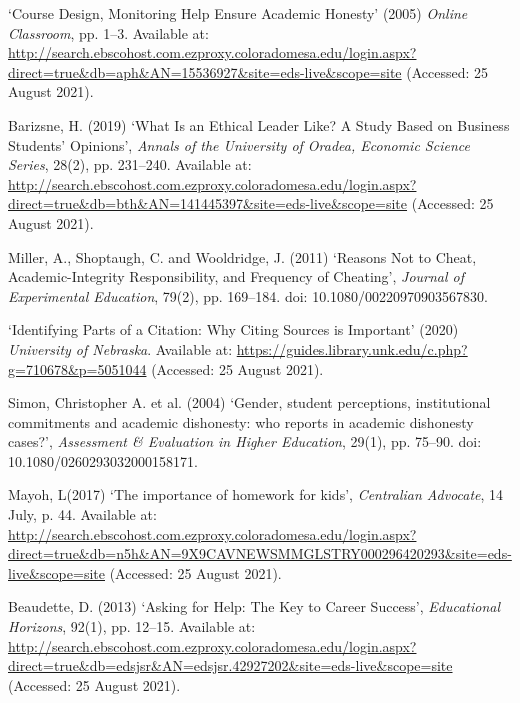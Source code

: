\documentclass[11pt]{article}
\begin{document}
\begin{thebibliography}{1}

 ‘Course Design, Monitoring Help Ensure Academic Honesty’ (2005) {\em Online Classroom}, pp. 1–3. Available at: \url{ http://search.ebscohost.com.ezproxy.coloradomesa.edu/login.aspx?direct=true\&db=aph\&AN=15536927\&site=eds-live\&scope=site} (Accessed: 25 August 2021). 

   Barizsne, H. (2019) ‘What Is an Ethical Leader Like? A Study Based on Business Students’ Opinions’, {\em Annals of    the University of Oradea, Economic Science Series}, 28(2), pp. 231–240. Available at:  \url{http://search.ebscohost.com.ezproxy.coloradomesa.edu/login.aspx?direct=true\&db=bth\&AN=141445397\&site=eds-live\&scope=site} (Accessed: 25 August 2021). 

Miller, A., Shoptaugh, C. and Wooldridge, J. (2011) ‘Reasons Not to Cheat, Academic-Integrity Responsibility, and Frequency of Cheating’, {\em Journal of Experimental Education}, 79(2), pp. 169–184. doi: 10.1080/00220970903567830. 


 ‘Identifying Parts of a Citation: Why Citing Sources is Important’ (2020) {\em University of Nebraska}. Available at: \url { https://guides.library.unk.edu/c.php?g=710678\&p=5051044} (Accessed: 25 August 2021). 

 Simon, Christopher A. et al. (2004) ‘Gender, student perceptions, institutional commitments and academic dishonesty: who reports in academic dishonesty cases?’, {\em Assessment \& Evaluation in Higher Education}, 29(1), pp. 75–90. doi: 10.1080/0260293032000158171. 

 Mayoh, L(2017) ‘The importance of homework for kids’, {\em Centralian Advocate}, 14 July, p. 44. Available at: \url {http://search.ebscohost.com.ezproxy.coloradomesa.edu/login.aspx?direct=true\&db=n5h\&AN=9X9CAVNEWSMMGLSTRY000296420293\&site=eds-live\&scope=site} (Accessed: 25 August 2021). 

   Beaudette, D. (2013) ‘Asking for Help: The Key to Career Success’, {\em Educational Horizons}, 92(1), pp. 12–15. Available at: \url{http://search.ebscohost.com.ezproxy.coloradomesa.edu/login.aspx?direct=true\&db=edsjsr\&AN=edsjsr.42927202\&site=eds-live&scope=site} (Accessed: 25 August 2021). 











 \end{thebibliography}
\end{document}
